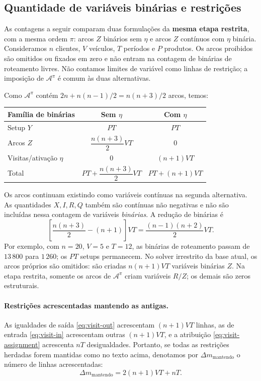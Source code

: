 \documentclass[11pt,a4paper]{article}
\newcommand{\A}{\mathcal{A}}
\begin{document}
\subsection{Quantidade de variáveis binárias e restrições}

As contagens a seguir comparam duas formulações da \textbf{mesma etapa restrita}, com a mesma ordem $\pi$: arcos $Z$ binários sem $\eta$ e arcos $Z$ contínuos com $\eta$ binária. Consideramos $n$ clientes, $V$ veículos, $T$ períodos e $P$ produtos. Os arcos proibidos são omitidos ou fixados em zero e não entram na contagem de binárias de roteamento livres. Não contamos limites de variável como linhas de restrição; a imposição de $\A^\pi$ é comum às duas alternativas.

Como $\A^\pi$ contém $2n+n(n-1)/2=n(n+3)/2$ arcos, temos:
\begin{center}
\begin{tabular}{lcc}
\toprule
Família de binárias & Sem $\eta$ & Com $\eta$ \\
\midrule
Setup $Y$ & $PT$ & $PT$ \\
Arcos $Z$ & $\dfrac{n(n+3)}{2}VT$ & $0$ \\
Visitas/ativação $\eta$ & $0$ & $(n+1)VT$ \\
\midrule
Total & $PT+\dfrac{n(n+3)}{2}VT$ & $PT+(n+1)VT$ \\
\bottomrule
\end{tabular}
\end{center}
Os arcos continuam existindo como variáveis contínuas na segunda alternativa. As quantidades $X,I,R,Q$ também são contínuas não negativas e não são incluídas nessa contagem de variáveis \emph{binárias}. A redução de binárias é
\[
 \left[\frac{n(n+3)}{2}-(n+1)\right]VT
 =\frac{(n-1)(n+2)}{2}VT.
\]
Por exemplo, com $n=20$, $V=5$ e $T=12$, as binárias de roteamento passam de $13\,800$ para $1\,260$; os $PT$ setups permanecem. No solver irrestrito da base atual, os arcos próprios são omitidos: são criadas $n(n+1)VT$ variáveis binárias $Z$. Na etapa restrita, somente os arcos de $\A^\pi$ criam variáveis $R/Z$; os demais são zeros estruturais.

\paragraph{Restrições acrescentadas mantendo as antigas.} As igualdades de saída \eqref{eq:visit-out} acrescentam $(n+1)VT$ linhas, as de entrada \eqref{eq:visit-in} acrescentam outras $(n+1)VT$, e a atribuição \eqref{eq:visit-assignment} acrescenta $nT$ desigualdades. Portanto, se todas as restrições herdadas forem mantidas como no texto acima, denotamos por $\Delta m_{\mathrm{mantendo}}$ o número de linhas acrescentadas:
\[
 \Delta m_{\mathrm{mantendo}}=2(n+1)VT+nT.
\]
\end{document}
